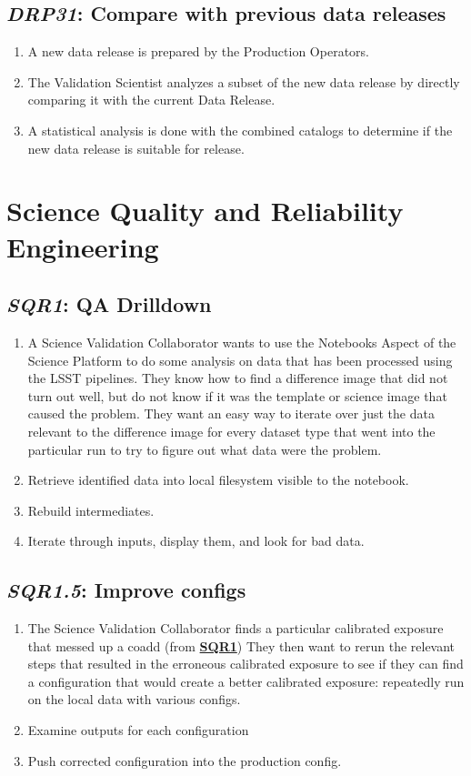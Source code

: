 \documentclass[DM,toc,lsstdraft]{lsstdoc}
\newcommand{\usecase}[3]{%
\subsection{\emph{#1}: #2}
\label{use:#1}
\begin{enumerate}[label=\alph*.]
#3
\end{enumerate}
}
\newcommand{\useref}[1]{\hyperref[use:#1]{\textcolor{lsstblue}{\textbf{#1}}}}
\begin{document}
\usecase{DRP31}{Compare with previous data releases}{%

\item
A new data release is prepared by the Production Operators.

\item
The Validation Scientist analyzes a subset of the new data release by directly comparing it with the current Data Release.

\item
A statistical analysis is done with the combined catalogs to determine if the new data release is suitable for release.

}

\section{Science Quality and Reliability Engineering}

\usecase{SQR1}{QA Drilldown}{%

\item
A Science Validation Collaborator wants to use the Notebooks Aspect of the Science Platform to do some analysis on data that has been processed using the LSST pipelines.
They know how to find a difference image that did not turn out well, but do not know if it was the template or science image that caused the problem.
They want an easy way to iterate over just the data relevant to the difference image for every dataset type that went into the particular run to try to figure out what data were the problem.

\item
Retrieve identified data into local filesystem visible to the notebook.

\item
Rebuild intermediates.

\item
Iterate through inputs, display them, and look for bad data.

}

\usecase{SQR1.5}{Improve configs}{%

\item

The Science Validation Collaborator finds a particular calibrated exposure that messed up a coadd (from \useref{SQR1})
They then want to rerun the relevant steps that resulted in the erroneous calibrated exposure to see if they can find a configuration that would create a better calibrated exposure: repeatedly run on the local data with various configs.

\item
Examine outputs for each configuration

\item
Push corrected configuration into the production config.

}
\end{document}

